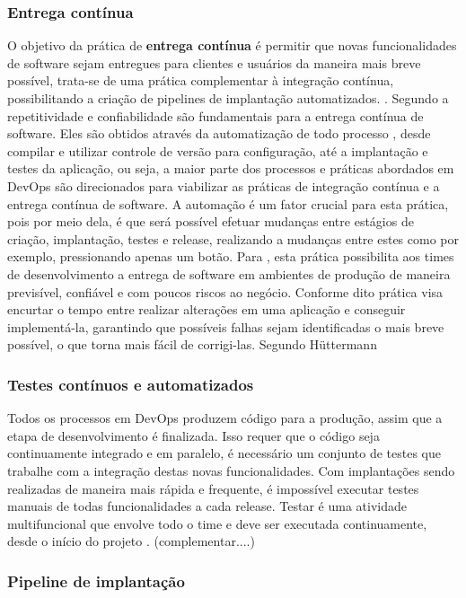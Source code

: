 \documentclass[twoside,english,brazilian]{UNISINOSartigo}
\begin{document}
\subsubsection{Entrega contínua}
O objetivo da prática de \textbf{entrega contínua} é permitir que novas funcionalidades de software sejam entregues para clientes e usuários da maneira mais breve possível, trata-se de uma prática complementar à integração contínua, possibilitando a criação de pipelines de implantação automatizados. \cite{Sharma2014}. \newline
Segundo  a repetitividade e confiabilidade são fundamentais para a entrega contínua de software. Eles são obtidos através da automatização de todo processo , desde compilar e utilizar controle de versão para configuração, até a implantação e testes da aplicação, ou seja, a maior parte dos processos e práticas abordados em DevOps são direcionados para viabilizar as práticas de integração contínua e a entrega contínua de software. A automação é um fator crucial para esta prática, pois por meio dela, é que será possível efetuar mudanças entre estágios de criação, implantação, testes e release, realizando a mudanças entre estes como por exemplo, pressionando apenas um botão. 
Para , esta prática possibilita aos times de desenvolvimento a entrega de software em ambientes de produção de maneira previsível, confiável e com poucos riscos ao negócio. \newline
Conforme dito prática visa encurtar o tempo entre realizar alterações em uma aplicação e conseguir implementá-la, garantindo que possíveis falhas sejam identificadas o mais breve possível, o que torna mais fácil de corrigi-las. Segundo Hüttermann \citep[112]{HUTTERMANN12}
\subsubsection{Testes contínuos e automatizados}
Todos os processos em DevOps produzem código para a produção, assim que a etapa de desenvolvimento é finalizada. Isso requer que o código seja continuamente integrado e em paralelo, é necessário um conjunto de testes que trabalhe com a integração destas novas funcionalidades. Com implantações sendo realizadas de maneira mais rápida e frequente, é impossível executar testes manuais  de todas funcionalidades a cada release. Testar é uma atividade multifuncional que envolve todo o time e deve ser executada continuamente, desde o início do projeto \cite{Humble2012}.  (complementar....)
\subsubsection{Pipeline de implantação}
\end{document}
